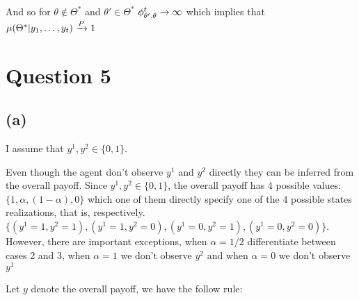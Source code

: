 \documentclass{article}
\begin{document}
And so for $\theta \not\in \Theta^*$ and $\theta' \in \Theta^*$
$\phi_{\theta', \theta}^t \to \infty$ which implies that $\mu(\Theta^* | y_1, \ldots, y_t) \xrightarrow{P} 1$ 


\section{Question 5}%
\label{sec:Question 5}

\subsection{(a)} %

I assume that $y^1, y^2 \in \{0, 1\}$.

Even though the agent don't observe $y^1$ and $y^2$ directly they can be inferred
from the overall payoff. Since $y^1, y^2 \in \{0, 1\}$, the overall payoff has 4 
possible values: $\{1, \alpha, (1-\alpha), 0\}$ which one of them directly
specify one of the 4 possible states realizations, that is, respectively.
$\{(y^1 = 1, y^2 = 1), (y^1 = 1, y^2 = 0), (y^1 = 0, y^2 = 1),(y^1 = 0, y^2 = 0)\}$.
However, there are important exceptions, when $\alpha = 1/2$ differentiate between cases
2 and 3, when $\alpha = 1$ we don't observe $y^2$ and when $\alpha = 0$ we don't
observe $y^1$

Let $y$ denote the overall payoff, we have the follow rule:
\end{document}
